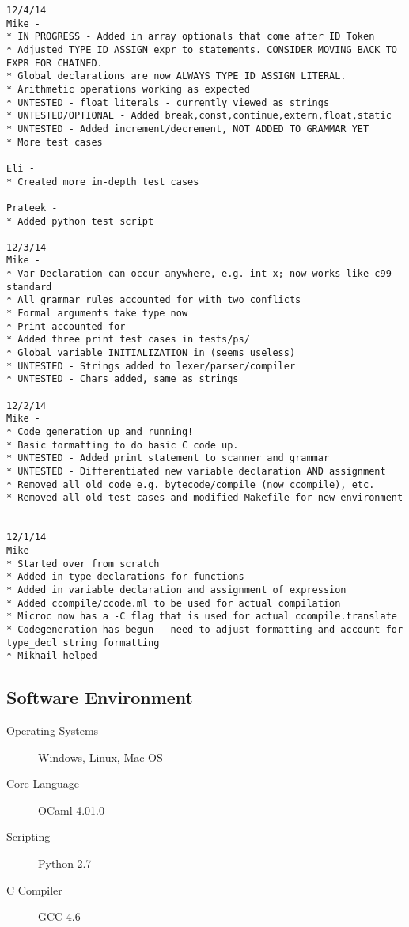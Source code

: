 \documentclass[a4paper]{article}
\begin{document}
\begin{description}
\begin{verbatim}
12/4/14
Mike -
* IN PROGRESS - Added in array optionals that come after ID Token
* Adjusted TYPE ID ASSIGN expr to statements. CONSIDER MOVING BACK TO EXPR FOR CHAINED.
* Global declarations are now ALWAYS TYPE ID ASSIGN LITERAL.
* Arithmetic operations working as expected
* UNTESTED - float literals - currently viewed as strings
* UNTESTED/OPTIONAL - Added break,const,continue,extern,float,static 
* UNTESTED - Added increment/decrement, NOT ADDED TO GRAMMAR YET
* More test cases

Eli -
* Created more in-depth test cases 

Prateek -
* Added python test script

12/3/14
Mike -
* Var Declaration can occur anywhere, e.g. int x; now works like c99 standard
* All grammar rules accounted for with two conflicts
* Formal arguments take type now
* Print accounted for
* Added three print test cases in tests/ps/
* Global variable INITIALIZATION in (seems useless)
* UNTESTED - Strings added to lexer/parser/compiler
* UNTESTED - Chars added, same as strings

12/2/14
Mike -  
* Code generation up and running!
* Basic formatting to do basic C code up.
* UNTESTED - Added print statement to scanner and grammar
* UNTESTED - Differentiated new variable declaration AND assignment
* Removed all old code e.g. bytecode/compile (now ccompile), etc.
* Removed all old test cases and modified Makefile for new environment


12/1/14
Mike -  
* Started over from scratch
* Added in type declarations for functions
* Added in variable declaration and assignment of expression
* Added ccompile/ccode.ml to be used for actual compilation
* Microc now has a -C flag that is used for actual ccompile.translate
* Codegeneration has begun - need to adjust formatting and account for type_decl string formatting
* Mikhail helped
\end{verbatim}
\normalsize
\end{description}

\subsection{Software Environment}
\begin{description}
\item[Operating Systems] Windows, Linux, Mac OS
\item[Core Language] OCaml 4.01.0
\item[Scripting] Python 2.7
\item[C Compiler] GCC 4.6
\end{description}
\end{document}
